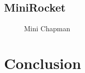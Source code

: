 \documentclass{article}
\begin{document}
\subsection{MiniRocket}
\begin{figure}[htbp]
  \caption{Mini Chapman}\label{fig:mini_chapman}
\end{figure}
\section{Conclusion}
\printbibliography
\end{document}
